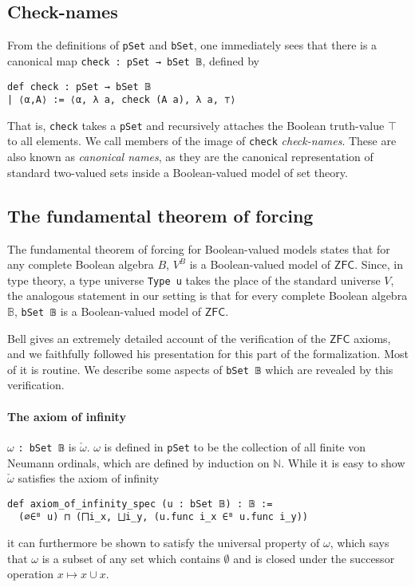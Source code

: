 \documentclass[a4paper,USenglish,cleveref, autoref]{lipics-v2019}
\newcommand{\B}{\mathbb{B}}
\newcommand{\lil}{\lstinline}
\theoremstyle{definition}
\begin{document}
\subsection{Check-names}
From the definitions of \lil{pSet} and \lil{bSet}, one immediately sees that there is a canonical map \lil{check : pSet → bSet 𝔹}, defined by
\begin{lstlisting}
def check : pSet → bSet 𝔹
| ⟨α,A⟩ := ⟨α, λ a, check (A a), λ a, ⊤⟩
\end{lstlisting}

That is, \lil{check} takes a \lil{pSet} and recursively attaches the Boolean truth-value $\top$ to all elements. We call members of the image of \lil{check} \emph{check-names}. These are also known as \emph{canonical names}, as they are the canonical representation of standard two-valued sets inside a Boolean-valued model of set theory.

\subsection{The fundamental theorem of forcing}

The fundamental theorem of forcing for Boolean-valued models \cite{hamkins-seabold1} states that for any complete Boolean algebra $B$, $V^B$ is a Boolean-valued model of $\mathsf{ZFC}$. Since, in type theory, a type universe \lstinline{Type u} takes the place of the standard universe $V$, the analogous statement in our setting is that for every complete Boolean algebra $\B$, \lstinline{bSet 𝔹} is a Boolean-valued model of $\mathsf{ZFC}$.

Bell \cite{bell1} gives an extremely detailed account of the verification of the $\mathsf{ZFC}$ axioms, and we faithfully followed his presentation for this part of the formalization. Most of it is routine. We describe some aspects of \lil{bSet 𝔹} which are revealed by this verification.

\paragraph*{The axiom of infinity}
$\omega$ \lil{: bSet 𝔹} is $\check{\omega}$. $\omega$ is defined in \lil{pSet} to be the collection of all finite von Neumann ordinals, which are defined by induction on $\mathbb{N}$. While it is easy to show $\check{\omega}$ satisfies the axiom of infinity
\begin{lstlisting}
def axiom_of_infinity_spec (u : bSet 𝔹) : 𝔹 :=
  (∅∈ᴮ u) ⊓ (⨅i_x, ⨆i_y, (u.func i_x ∈ᴮ u.func i_y))
\end{lstlisting}
it can furthermore be shown to satisfy the universal property of $\omega$, which says that $\omega$ is a subset of any set which contains $\emptyset$ and is closed under the successor operation $x \mapsto x \cup {x}$.
\end{document}
